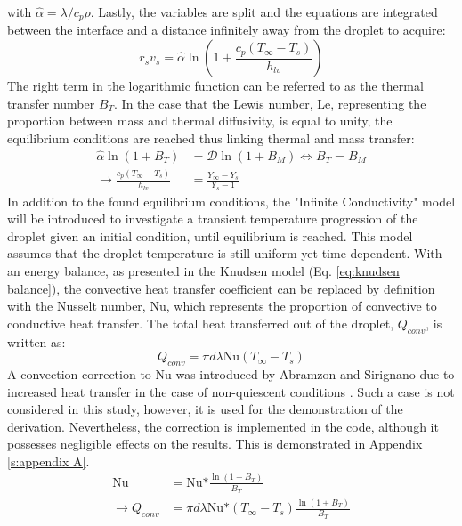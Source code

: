 \documentclass[12pt]{article}
\numberwithin{equation}{section}
\begin{document}
with $\hat{\alpha}=\lambda/c_{p}\rho$. Lastly, the variables are split and the equations are integrated between the interface and a distance infinitely away from the droplet to acquire: 
\begin{equation}\label{eq:d2_cond_energygrowth}
    r_{s}v_{s}=\hat{\alpha}\ln\left(1+\frac{c_{p}(T_{\infty}-T_{s})}{h_{lv}}\right)
\end{equation}
The right term in the logarithmic function can be referred to as the thermal transfer number $B_{T}$. In the case that the Lewis number, \textrm{Le}, representing the proportion between mass and thermal diffusivity, is equal to unity, the equilibrium conditions are reached thus linking thermal and mass transfer:
\begin{equation}
    \begin{aligned}
        \hat{\alpha}\ln(1+B_{T})&=\mathcal{D}\ln(1+B_{M})\Longleftrightarrow B_{T}=B_{M}\\
        \rightarrow  \frac{c_{p}(T_{\infty}-T_{s})}{h_{lv}}&=\frac{Y_{\infty}-Y_{s}}{Y_{s}-1}
    \end{aligned}
\end{equation}
In addition to the found equilibrium conditions, the "Infinite Conductivity" model \cite{abramzon1989droplet} will be introduced to investigate a transient temperature progression of the droplet given an initial condition, until equilibrium is reached. This model assumes that the droplet temperature is still uniform yet time-dependent. With an energy balance, as presented in the Knudsen model (Eq. \ref{eq:knudsen balance}), the convective heat transfer coefficient can be replaced by definition with the Nusselt number, \textrm{Nu}, which represents the proportion of convective to conductive heat transfer. The total heat transferred out of the droplet, $Q_{conv}$, is written as:
\begin{equation}
    Q_{conv}=\pi d\lambda\textrm{Nu}(T_{\infty}-T_{s})
\end{equation}
A convection correction to \textrm{Nu} was introduced by Abramzon and Sirignano due to increased heat transfer in the case of non-quiescent conditions \cite{abramzon1989droplet}. Such a case is not considered in this study, however, it is used for the demonstration of the derivation. Nevertheless, the correction is implemented in the code, although it possesses negligible effects on the results. This is demonstrated in Appendix \ref{s:appendix A}. 
\begin{equation}
    \begin{aligned}
        \textrm{Nu}&=\textrm{Nu*}\frac{\ln(1+B_{T})}{B_{T}} \\
        \rightarrow Q_{conv}&=\pi d\lambda\textrm{Nu*}(T_{\infty}-T_{s})\frac{\ln(1+B_{T})}{B_{T}}
    \end{aligned}
\end{equation}
\end{document}
